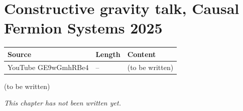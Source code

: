 \chapter{Constructive gravity talk, Causal Fermion Systems 2025}\label{ch:c32}
\begin{paracol}{2}

\begin{sources}
\begin{tabularx}{\linewidth}{@{}l l L@{}}
\toprule
\textbf{Source} & \textbf{Length} & \textbf{Content}\\
\midrule
YouTube GE9wGmhRBe4 & -- & (to be written)\\
\bottomrule
\end{tabularx}

\end{sources}

\begin{reading}
(to be written)
\end{reading}

\emph{This chapter has not been written yet.}

\flushside
\end{paracol}
